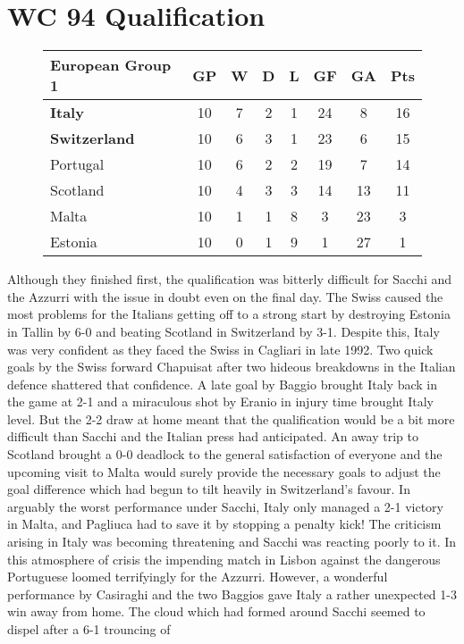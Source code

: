 \section{WC 94 Qualification}
\begin{figure}[H]
\begin{tabular}{l c c c c c c c}
European Group 1 & GP & W & D & L & GF & GA & Pts \\ \hline
\textbf{Italy} & 10 & 7 & 2 & 1 & 24 & 8 & 16 \\
\textbf{Switzerland} & 10 & 6 & 3 & 1 & 23 & 6 & 15 \\
Portugal & 10 & 6 & 2 & 2 & 19 & 7 & 14 \\
Scotland & 10 & 4 & 3 & 3 & 14 & 13 & 11 \\
Malta & 10 & 1 & 1 & 8 & 3 & 23 & 3 \\
Estonia & 10 & 0 & 1 & 9 & 1 & 27 & 1 \\ \hline
\end{tabular}
\end{figure}
Although they finished first, the qualification was bitterly difficult for
Sacchi and the Azzurri with the issue in doubt even on the final day. The 
Swiss caused the most problems for the Italians getting off to a strong start
by destroying Estonia in Tallin by 6-0 and beating Scotland in Switzerland by
3-1. Despite this, Italy was very confident as they faced the Swiss in Cagliari
in late 1992. Two quick goals by the Swiss forward Chapuisat after two hideous 
breakdowns in the Italian defence shattered that confidence. A late goal by 
Baggio brought Italy back in the game at 2-1 and a miraculous shot by Eranio in
injury time brought Italy level. But the 2-2 draw at home meant that the 
qualification would be a bit more difficult than Sacchi and the Italian press 
had anticipated. An away trip to Scotland brought a 0-0 deadlock to the general
satisfaction of everyone and the upcoming visit to Malta would surely provide 
the necessary goals to adjust the goal difference which had begun to tilt 
heavily in Switzerland's favour. In arguably the worst performance under Sacchi,
Italy only managed a 2-1 victory in Malta, and Pagliuca had to save it by 
stopping a penalty kick!  The criticism arising in Italy was becoming 
threatening and Sacchi was reacting poorly to it. In this atmosphere of crisis 
the impending match in Lisbon against the dangerous Portuguese loomed 
terrifyingly for the Azzurri. However, a wonderful performance by Casiraghi and
the two Baggios gave Italy a rather unexpected 1-3 win away from home. The 
cloud which had formed around Sacchi seemed to dispel after a 6-1 trouncing of 

